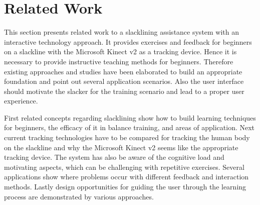 \chapter{Related Work}\label{2_relatedWork}

This section presents related work to a slacklining assistance system with an interactive technology approach. It provides exercises and feedback for beginners on a slackline with the Microsoft Kinect v2 as a tracking device. Hence it is necessary to provide instructive teaching methods for beginners. Therefore existing approaches and studies have been elaborated to build an appropriate foundation and point out several application scenarios. Also the user interface should motivate the slacker for the training scenario and lead to a proper user experience.

First related concepts regarding slacklining show how to build learning techniques for beginners, the efficacy of it in balance training, and areas of application. Next current tracking technologies have to be compared for tracking the human body on the slackline and why the Microsoft Kinect v2 seems like the appropriate tracking device. The system has also be aware of the cognitive load and motivating aspects, which can be challenging with repetitive exercises. Several applications show where problems occur with different feedback and interaction methods. Lastly design opportunities for guiding the user through the learning process are demonstrated by various approaches.

\label{2_1_slacklineTraining}

\label{2_2_interactiveTechnology}

\label{2_3_feedbackMethods}

\label{2_4_uiDesign}


\newpage
